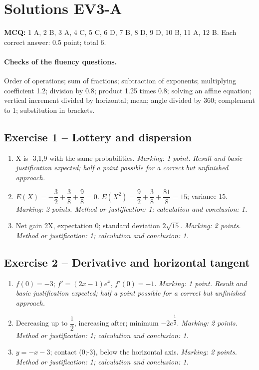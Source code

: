 \clearpage\section*{Solutions EV3-A}\label{EV3-A-CORR}
\textbf{MCQ:} 1 A, 2 B, 3 A, 4 C, 5 C, 6 D, 7 B, 8 D, 9 D, 10 B, 11 A, 12 B. Each correct answer: 0.5 point; total 6.
\paragraph{Checks of the fluency questions.} Order of operations; sum of fractions; subtraction of exponents; multiplying coefficient 1.2; division by 0.8; product 1.25 times 0.8; solving an affine equation; vertical increment divided by horizontal; mean; angle divided by 360; complement to 1; substitution in brackets.
\subsection*{Exercise 1 -- Lottery and dispersion}
\begin{enumerate}
\item X is -3,1,9 with the same probabilities. \textit{Marking: 1 point. Result and basic justification expected; half a point possible for a correct but unfinished approach.}
\item $E(X)=-\dfrac{3}{2}+\dfrac{3}{8}+\dfrac{9}{8}=0$. $E(X^2)=\dfrac{9}{2}+\dfrac{3}{8}+\dfrac{81}{8}=15$; variance 15. \textit{Marking: 2 points. Method or justification: 1; calculation and conclusion: 1.}
\item Net gain 2X, expectation 0; standard deviation $2\sqrt{15}$. \textit{Marking: 2 points. Method or justification: 1; calculation and conclusion: 1.}
\end{enumerate}
\subsection*{Exercise 2 -- Derivative and horizontal tangent}
\begin{enumerate}
\item $f(0)=-3$; $f\prime=(2x-1)e^x$, $f\prime(0)=-1$. \textit{Marking: 1 point. Result and basic justification expected; half a point possible for a correct but unfinished approach.}
\item Decreasing up to $\dfrac{1}{2}$, increasing after; minimum $-2e^{\dfrac{1}{2}}$. \textit{Marking: 2 points. Method or justification: 1; calculation and conclusion: 1.}
\item $y=-x-3$; contact (0;-3), below the horizontal axis. \textit{Marking: 2 points. Method or justification: 1; calculation and conclusion: 1.}
\end{enumerate}
